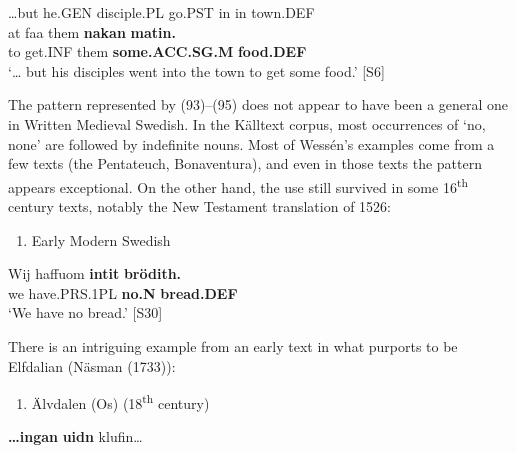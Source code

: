 …but  he.GEN  disciple.PL  go.PST  in  in  town.DEF\\ %


\ea\label{}
\gll at  faa  them  \textbf{nakan} \textbf{matin.}\\


to  get.INF  them  \textbf{some.ACC.SG.M} \textbf{food.DEF}\\ %


‘… but his disciples went into the town to get some food.’ [S6]
\z

The pattern represented by (93)–(95) does not appear to have been a general one in Written Medieval Swedish. In the Källtext corpus, most occurrences of  ‘no, none’ are followed by indefinite nouns. Most of Wessén’s examples come from a few texts (the Pentateuch, Bonaventura), and even in those texts the pattern appears exceptional. On the other hand, the use still survived in some 16\textsuperscript{th} century texts, notably the New Testament translation of 1526:

\begin{enumerate} %
\item 
Early Modern Swedish

\end{enumerate} %
\ea\label{}
\gll Wij  haffuom  \textbf{intit} \textbf{brödith.}\\


we  have.PRS.1PL  \textbf{no.N} \textbf{bread.DEF}\\ %


‘We have no bread.’ [S30]
\z

There is an intriguing example from an early text in what purports to be Elfdalian (Näsman (1733)):

\begin{enumerate} %
\item 
\label{bkm:Ref108604709}Älvdalen (Os) (18\textsuperscript{th} century)
\end{enumerate} %
\ea\label{}
\gll \textbf{…ingan} \textbf{uidn} klufin…\\



